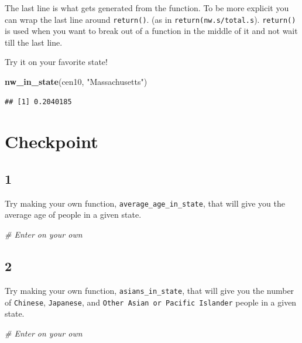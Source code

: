 \documentclass[]{book}
\newenvironment{Shaded}{\begin{snugshade}}{\end{snugshade}}
\newcommand{\KeywordTok}[1]{\textcolor[rgb]{0.13,0.29,0.53}{\textbf{#1}}}
\newcommand{\StringTok}[1]{\textcolor[rgb]{0.31,0.60,0.02}{#1}}
\newcommand{\CommentTok}[1]{\textcolor[rgb]{0.56,0.35,0.01}{\textit{#1}}}
\newcommand{\NormalTok}[1]{#1}
\theoremstyle{definition}
\theoremstyle{definition}
\theoremstyle{definition}
\theoremstyle{remark}
\begin{document}
The last line is what gets generated from the function. To be more
explicit you can wrap the last line around \texttt{return()}. (as in
\texttt{return(nw.s/total.s}). \texttt{return()} is used when you want
to break out of a function in the middle of it and not wait till the
last line.

Try it on your favorite state!

\begin{Shaded}
\begin{Highlighting}[]
\KeywordTok{nw_in_state}\NormalTok{(cen10, }\StringTok{"Massachusetts"}\NormalTok{)}
\end{Highlighting}
\end{Shaded}

\begin{verbatim}
## [1] 0.2040185
\end{verbatim}

\section*{Checkpoint}\label{checkpoint-1}

\subsection*{1}\label{section-14}

Try making your own function, \texttt{average\_age\_in\_state}, that
will give you the average age of people in a given state.

\begin{Shaded}
\begin{Highlighting}[]
\CommentTok{# Enter on your own}
\end{Highlighting}
\end{Shaded}

\subsection*{2}\label{section-15}

Try making your own function, \texttt{asians\_in\_state}, that will give
you the number of \texttt{Chinese}, \texttt{Japanese}, and
\texttt{Other\ Asian\ or\ Pacific\ Islander} people in a given state.

\begin{Shaded}
\begin{Highlighting}[]
\CommentTok{# Enter on your own}
\end{Highlighting}
\end{Shaded}
\end{document}
